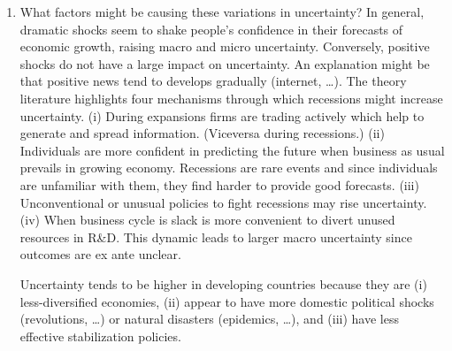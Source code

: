 \documentclass{article}
\begin{document}
{\begin{enumerate}
	\item What factors might be causing these variations in uncertainty? In general, dramatic shocks seem to shake people's confidence in their forecasts of economic growth, raising macro and micro uncertainty. Conversely, positive shocks do not have a large impact on uncertainty. An explanation might be that positive news tend to develops gradually (internet, \dots). The theory literature highlights four mechanisms through which recessions might increase uncertainty. (i) During expansions firms are trading actively which help to generate and spread information. (Viceversa during recessions.) (ii) Individuals are more confident in predicting the future when business as usual prevails in growing economy. Recessions are rare events and since individuals are unfamiliar with them, they find harder to provide good forecasts. (iii) Unconventional or unusual policies to fight recessions may rise uncertainty. (iv) When business cycle is slack is more convenient to divert unused resources in R\&D. This dynamic leads to larger macro uncertainty since outcomes are ex ante unclear. 
	
	Uncertainty tends to be higher in developing countries because they are (i) less-diversified economies, (ii) appear to have more domestic political shocks (revolutions, \dots) or natural disasters (epidemics, \dots), and (iii) have less effective stabilization policies.
	

\end{enumerate}}
\end{document}

